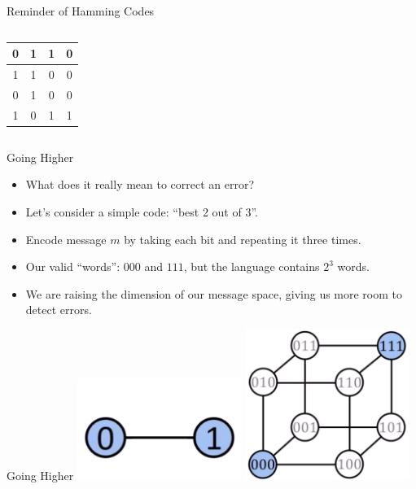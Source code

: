 \documentclass[aspectratio=169]{beamer}
\makeatletter
\newcommand{\blu}[1]{{\color{sigma@mainblue}#1}}
\makeatother
\begin{document}
\begin{frame}{Reminder of Hamming Codes}
\begin{columns}[c]
    \hfill
    \begin{column}{2cm}
    \begin{table}
        \centering
        \begin{tabular}{|c|c|c|c|}
            \hline     
            0 & 1 & 1 & 0 \\ \hline
            1 & 1 & \blu{0} & 0 \\ \hline
            \rowcolor{LightRed}
            0 & 1 & 0 & 0 \\ \hline
            \rowcolor{LightRed}
            1 & 0 & 1 & 1 \\ \hline
        \end{tabular}
    \end{table}
    \end{column}
    \end{columns}
\end{frame}

\begin{frame}{Going Higher}
    \begin{itemize}
        \item What does it really mean to correct an error? 
        \item Let's consider a simple code: ``best 2 out of 3''. 
        \item Encode message $m$ by taking each bit and repeating it three times. \pause
        \item Our valid ``words'': $000$ and $111$, but the language contains $2^3$ words. 
        \item We are raising the dimension of our message space, giving us more room to detect errors. 
    \end{itemize}
\end{frame}

\begin{frame}{Going Higher}
    \includegraphics[width=0.4\textwidth]{images/01.png}
    \includegraphics[width=0.4\textwidth]{images/000-111.png}
\end{frame}
\end{document}
